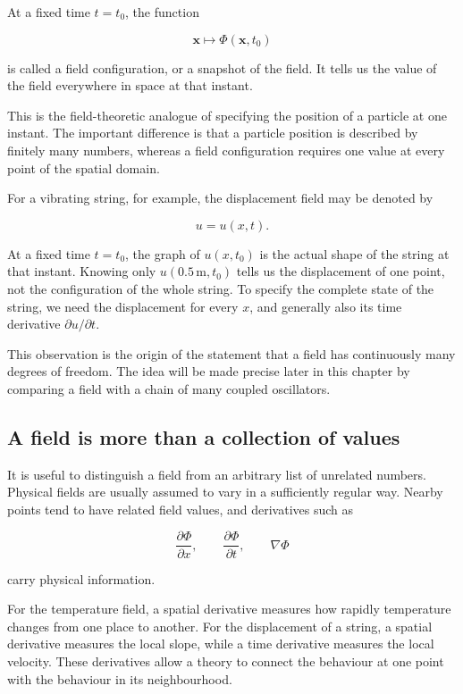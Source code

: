 At a fixed time \(t=t_{0}\), the function

\[
\mathbf{x}\longmapsto \Phi(\mathbf{x},t_{0})
\]

is called a field configuration, or a snapshot of the field. It tells us the value of the field everywhere in space at that instant.

This is the field-theoretic analogue of specifying the position of a particle at one instant. The important difference is that a particle position is described by finitely many numbers, whereas a field configuration requires one value at every point of the spatial domain.

For a vibrating string, for example, the displacement field may be denoted by

\[
u=u(x,t).
\]

At a fixed time \(t=t_{0}\), the graph of \(u(x,t_{0})\) is the actual shape of the string at that instant. Knowing only \(u(0.5\,\mathrm{m},t_{0})\) tells us the displacement of one point, not the configuration of the whole string. To specify the complete state of the string, we need the displacement for every \(x\), and generally also its time derivative \(\partial u/\partial t\).

This observation is the origin of the statement that a field has continuously many degrees of freedom. The idea will be made precise later in this chapter by comparing a field with a chain of many coupled oscillators.

\subsection{A field is more than a collection of values}

It is useful to distinguish a field from an arbitrary list of unrelated numbers. Physical fields are usually assumed to vary in a sufficiently regular way. Nearby points tend to have related field values, and derivatives such as

\[
\frac{\partial \Phi}{\partial x},
\qquad
\frac{\partial \Phi}{\partial t},
\qquad
\nabla \Phi
\]

carry physical information.

For the temperature field, a spatial derivative measures how rapidly temperature changes from one place to another. For the displacement of a string, a spatial derivative measures the local slope, while a time derivative measures the local velocity. These derivatives allow a theory to connect the behaviour at one point with the behaviour in its neighbourhood.

